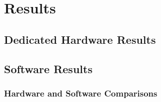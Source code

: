\chapter{Results}

\section{Dedicated Hardware Results}

\section{Software Results}

\subsection{Hardware and Software Comparisons}

